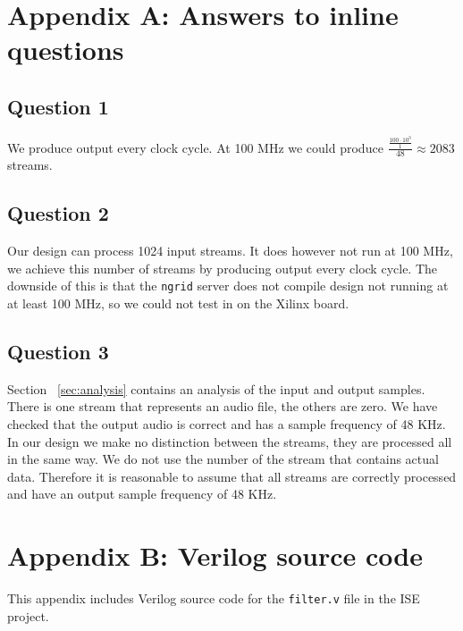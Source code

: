 \section{Appendix A: Answers to inline questions}
\subsection{Question 1}
We produce output every clock cycle. At 100 MHz we could produce
$\frac{\frac{100 \cdot 10^3}{1}}{48} \approx 2083$ streams.
\subsection{Question 2}
Our design can process 1024 input streams. It does however not run at 100 MHz, we achieve this number of streams by producing output every clock cycle. The downside of this is that the \texttt{ngrid} server does not compile design not running at at least 100 MHz, so we could not test in on the Xilinx board.
\subsection{Question 3}
Section ~\ref{sec:analysis} contains an analysis of the input and output samples. There is one stream that represents an audio file, the others are zero. We have checked that the output audio is correct and has a sample frequency of 48 KHz. In our design we make no distinction between the streams, they are processed all in the same way. We do not use the number of the stream that contains actual data. Therefore it is reasonable to assume that all streams are correctly processed and have an output sample frequency of 48 KHz. 
\section{Appendix B: Verilog source code}
This appendix includes Verilog source code for the \texttt{filter.v} file in the ISE project.

